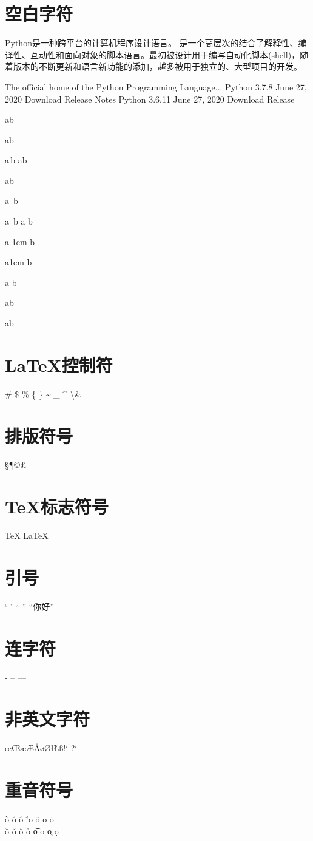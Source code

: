 \documentclass{article}
\begin{document}
	\section{空白字符}
	Python是一种跨平台的计算机程序设计语言。 是一个高层次的结合了解释性、编译性、互动性和面向对象的脚本语言。最初被设计用于编写自动化脚本(shell)，随着版本的不断更新和语言新功能的添加，越多被用于独立的、大型项目的开发。
	
	The official home of the Python Programming Language... Python 3.7.8 June 27, 2020 Download Release Notes Python 3.6.11 June 27, 2020 Download Release
	
	a\quad b
	
	a\qquad b
	
	a\,b a\thinspace b
	
	a\enspace b
	
	a\ b
	
	a~b
	a\kern 1pc b
	
	a\kern -1em b
	
	a\kern 1em b
	
	a\hspace{35pt} b
	
	a\hphantom{xyz}b
	
	
	a\hfill b
	
	\section{\LaTeX 控制符}
	\# \$ \% \{ \} \~{} \_{} \^{} \textbackslash \&
	
	\section{排版符号}
	\S \P \dag \ddag \copyright \pounds
	\section{\TeX 标志符号}
	\TeX{} \LaTeX{} \LaTeXe{}
	\XeLaTeX{}
	\section{引号}
	` ' `` '' ``你好''
	\section{连字符}
	- -- ---
	\section{非英文字符}
	\oe \OE \ae \AE \AA \o \O \l \L \ss \SS !` ?`
	\section{重音符号}
	\`o \'o \^o \''o \~o \=o \.o \\
	\u{o} \v{o} \H{o} \r{o} \t{o} \b{o} \c{o} \d{o}
\end{document}
